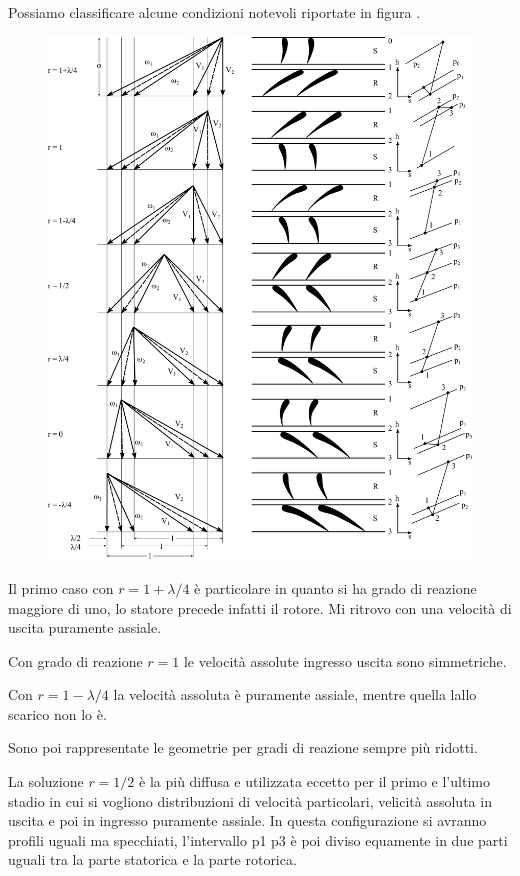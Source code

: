 Possiamo classificare alcune condizioni notevoli riportate in figura .
\begin{figure}
\centering
  \includegraphics[width=1.2\textwidth]{fig/ComprAssTab.pdf}
\caption{}
\label{fig:ComprAssTab}
\end{figure}
Il primo caso con $r = 1 + \lambda /4$ è particolare in quanto si ha grado di reazione maggiore di uno, lo statore precede infatti il rotore. Mi ritrovo con una velocità di uscita puramente assiale.

Con grado di reazione $r = 1$ le velocità assolute ingresso uscita sono simmetriche.

Con $r = 1 - \lambda/4$ la velocità assoluta è puramente assiale, mentre quella lallo scarico non lo è. 

Sono poi rappresentate le geometrie per gradi di reazione sempre più ridotti. 

La soluzione $r = 1/2$ è la più diffusa e utilizzata eccetto per il primo e l'ultimo stadio in cui si vogliono distribuzioni di velocità particolari, velicità assoluta in uscita e poi in ingresso puramente assiale. In questa configurazione si avranno profili uguali ma specchiati, l'intervallo p1 p3 è poi diviso equamente in due parti uguali tra la parte statorica e la parte rotorica. 


